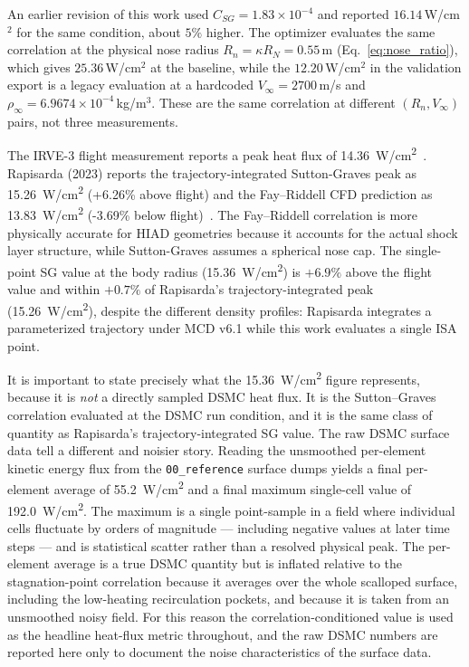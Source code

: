 An earlier revision of this work used $C_{SG} = 1.83 \times 10^{-4}$ and reported $16.14$\,W/cm$^2$ for the same condition, about $5\%$ higher. The optimizer evaluates the same correlation at the physical nose radius $R_n = \kappa R_N = 0.55$\,m (Eq.~\eqref{eq:nose_ratio}), which gives $25.36$\,W/cm$^2$ at the baseline, while the $12.20$\,W/cm$^2$ in the validation export is a legacy evaluation at a hardcoded $V_{\infty} = 2700$\,m/s and $\rho_{\infty} = 6.9674 \times 10^{-4}$\,kg/m$^3$. These are the same correlation at different $(R_n,V_{\infty})$ pairs, not three measurements.

The IRVE-3 flight measurement reports a peak heat flux of 14.36~W/cm\textsuperscript{2}~\cite{lau2013irve3}. Rapisarda (2023) reports the trajectory-integrated Sutton-Graves peak as 15.26~W/cm\textsuperscript{2} (+6.26\% above flight) and the Fay--Riddell CFD prediction as 13.83~W/cm\textsuperscript{2} (-3.69\% below flight)~\cite{rapisarda2023mdao}. The Fay--Riddell correlation is more physically accurate for HIAD geometries because it accounts for the actual shock layer structure, while Sutton-Graves assumes a spherical nose cap. The single-point SG value at the body radius (15.36~W/cm\textsuperscript{2}) is $+6.9\%$ above the flight value and within $+0.7\%$ of Rapisarda's trajectory-integrated peak (15.26~W/cm\textsuperscript{2}), despite the different density profiles: Rapisarda integrates a parameterized trajectory under MCD v6.1 while this work evaluates a single ISA point.

It is important to state precisely what the 15.36~W/cm\textsuperscript{2} figure represents, because it is \emph{not} a directly sampled DSMC heat flux. It is the Sutton--Graves correlation evaluated at the DSMC run condition, and it is the same class of quantity as Rapisarda's trajectory-integrated SG value. The raw DSMC surface data tell a different and noisier story. Reading the unsmoothed per-element kinetic energy flux from the \texttt{00\_reference} surface dumps yields a final per-element average of 55.2~W/cm\textsuperscript{2} and a final maximum single-cell value of 192.0~W/cm\textsuperscript{2}. The maximum is a single point-sample in a field where individual cells fluctuate by orders of magnitude --- including negative values at later time steps --- and is statistical scatter rather than a resolved physical peak. The per-element average is a true DSMC quantity but is inflated relative to the stagnation-point correlation because it averages over the whole scalloped surface, including the low-heating recirculation pockets, and because it is taken from an unsmoothed noisy field. For this reason the correlation-conditioned value is used as the headline heat-flux metric throughout, and the raw DSMC numbers are reported here only to document the noise characteristics of the surface data.

